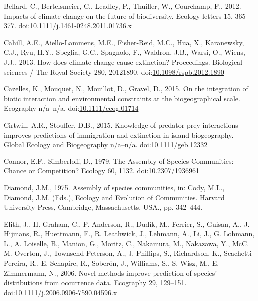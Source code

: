 \hypertarget{ref-Bellard2012}{}
Bellard, C., Bertelsmeier, C., Leadley, P., Thuiller, W., Courchamp, F.,
2012. Impacts of climate change on the future of biodiversity. Ecology
letters 15, 365--377.
doi:\href{https://doi.org/10.1111/j.1461-0248.2011.01736.x}{10.1111/j.1461-0248.2011.01736.x}

\hypertarget{ref-Cahill2013}{}
Cahill, A.E., Aiello-Lammens, M.E., Fisher-Reid, M.C., Hua, X.,
Karanewsky, C.J., Ryu, H.Y., Sbeglia, G.C., Spagnolo, F., Waldron, J.B.,
Warsi, O., Wiens, J.J., 2013. How does climate change cause extinction?
Proceedings. Biological sciences / The Royal Society 280, 20121890.
doi:\href{https://doi.org/10.1098/rspb.2012.1890}{10.1098/rspb.2012.1890}

\hypertarget{ref-Cazelles2015b}{}
Cazelles, K., Mouquet, N., Mouillot, D., Gravel, D., 2015. On the
integration of biotic interaction and environmental constraints at the
biogeographical scale. Ecography n/a--n/a.
doi:\href{https://doi.org/10.1111/ecog.01714}{10.1111/ecog.01714}

\hypertarget{ref-Cirtwill2015}{}
Cirtwill, A.R., Stouffer, D.B., 2015. Knowledge of predator-prey
interactions improves predictions of immigration and extinction in
island biogeography. Global Ecology and Biogeography n/a--n/a.
doi:\href{https://doi.org/10.1111/geb.12332}{10.1111/geb.12332}

\hypertarget{ref-Connor1979}{}
Connor, E.F., Simberloff, D., 1979. The Assembly of Species Communities:
Chance or Competition? Ecology 60, 1132.
doi:\href{https://doi.org/10.2307/1936961}{10.2307/1936961}

\hypertarget{ref-Diamond1975}{}
Diamond, J.M., 1975. Assembly of species communities, in: Cody, M.L.,
Diamond, J.M. (Eds.), Ecology and Evolution of Communities. Harvard
University Press, Cambridge, Massachusetts, USA., pp. 342--444.

\hypertarget{ref-Elith2006}{}
Elith, J., H. Graham, C., P. Anderson, R., Dudík, M., Ferrier, S.,
Guisan, A., J. Hijmans, R., Huettmann, F., R. Leathwick, J., Lehmann,
A., Li, J., G. Lohmann, L., A. Loiselle, B., Manion, G., Moritz, C.,
Nakamura, M., Nakazawa, Y., McC. M. Overton, J., Townsend Peterson, A.,
J. Phillips, S., Richardson, K., Scachetti-Pereira, R., E. Schapire, R.,
Soberón, J., Williams, S., S. Wisz, M., E. Zimmermann, N., 2006. Novel
methods improve prediction of species' distributions from occurrence
data. Ecography 29, 129--151.
doi:\href{https://doi.org/10.1111/j.2006.0906-7590.04596.x}{10.1111/j.2006.0906-7590.04596.x}

